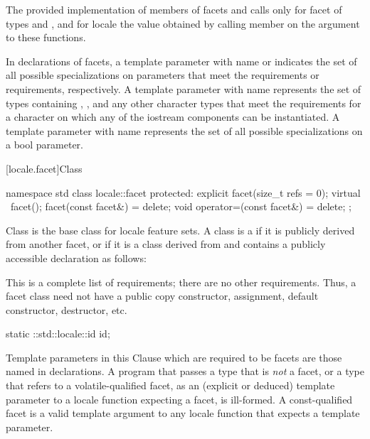 \pnum
The provided implementation of members of
facets  and 
calls  only for facet  of
types  and ,
and for locale  the value obtained by calling member 
on the  argument to these functions.

\pnum
In declarations of facets,
a template parameter with name  or 
indicates the set of all possible specializations on parameters that meet the
 requirements or
 requirements,
respectively.
A template parameter with name  represents
the set of types containing , , and any other
character types
that meet the requirements for a character
on which any of the iostream components can be instantiated.
A template parameter with name 
represents the set of all possible specializations on a bool parameter.

[locale.facet]{Class }

%
\begin{codeblock}
namespace std {
  class locale::facet {
  protected:
    explicit facet(size_t refs = 0);
    virtual ~facet();
    facet(const facet&) = delete;
    void operator=(const facet&) = delete;
  };
}
\end{codeblock}

\pnum
Class  is the base class for locale feature sets.
A class is a 
if it is publicly derived from another facet, or
if it is a class derived from  and
contains a publicly accessible declaration as follows:
\begin{footnote}
This is a complete list of requirements; there are no other requirements.
Thus, a facet class need not have a public
copy constructor, assignment, default constructor, destructor, etc.
\end{footnote}
\begin{codeblock}
static ::std::locale::id id;
\end{codeblock}

\pnum
Template parameters in this Clause
which are required to be facets
are those named  in declarations.
A program that passes
a type that is \textit{not} a facet, or
a type that refers to a volatile-qualified facet,
as an (explicit or deduced) template parameter to
a locale function expecting a facet,
is ill-formed.
A const-qualified facet is a valid template argument to
any locale function that expects a  template parameter.

